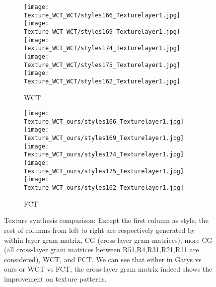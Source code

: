 \documentclass[runningheads]{llncs}
\begin{document}
\begin{figure*}[!htbp]
\begin{subfigure}[t]{0.153\textwidth}
	\texttt{[image: Texture\_WCT\_WCT/styles166\_Texturelayer1.jpg]}
	\texttt{[image: Texture\_WCT\_WCT/styles169\_Texturelayer1.jpg]}
	\texttt{[image: Texture\_WCT\_WCT/styles174\_Texturelayer1.jpg]}
	\texttt{[image: Texture\_WCT\_WCT/styles175\_Texturelayer1.jpg]}
    \texttt{[image: Texture\_WCT\_WCT/styles162\_Texturelayer1.jpg]}
    \caption{WCT}
\end{subfigure}
\begin{subfigure}[t]{0.153\textwidth}
	
	\texttt{[image: Texture\_WCT\_ours/styles166\_Texturelayer1.jpg]}
	\texttt{[image: Texture\_WCT\_ours/styles169\_Texturelayer1.jpg]}
	\texttt{[image: Texture\_WCT\_ours/styles174\_Texturelayer1.jpg]}
	\texttt{[image: Texture\_WCT\_ours/styles175\_Texturelayer1.jpg]}
    \texttt{[image: Texture\_WCT\_ours/styles162\_Texturelayer1.jpg]}
    \caption{FCT}
\end{subfigure}
\caption{Texture synthesis comparison: Except the first column as
  style, the rest of columns from left to right are respectively generated by
  within-layer gram matrix, CG (cross-layer gram matrices), more CG (all cross-layer gram matrices between R51,R4,R31,R21,R11 are considered), WCT, and FCT. We can see that
  either in Gatys vs ours or WCT vs FCT, the cross-layer gram
  matrix indeed shows the improvement on texture patterns. }
\label{fig:texture}
\end{figure*}
\end{document}
